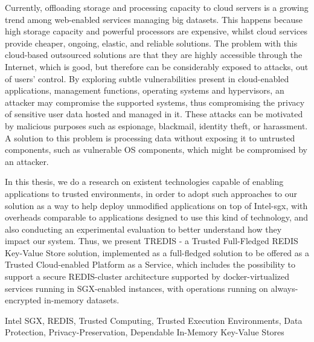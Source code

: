 
Currently, offloading storage and processing capacity to cloud servers is a growing
trend among web-enabled services managing big datasets. This happens because high
storage capacity and powerful processors are expensive, whilst cloud services provide
cheaper, ongoing, elastic, and reliable solutions. The problem with this cloud-based outsourced solutions are that they are highly accessible through the Internet, which is good,
but therefore can be considerably exposed to attacks, out of users’ control. By exploring
subtle vulnerabilities present in cloud-enabled applications, management functions, operating systems and hypervisors, an attacker may compromise the supported systems,
thus compromising the privacy of sensitive user data hosted and managed in it. These
attacks can be motivated by malicious purposes such as espionage, blackmail, identity
theft, or harassment. A solution to this problem is processing data without exposing it to
untrusted components, such as vulnerable OS components, which might be compromised
by an attacker.

In this thesis, we do a research on existent technologies capable of enabling applications to trusted environments, in order to adopt such approaches to our solution as a way to help deploy unmodified applications on top of Intel-\gls{sgx}, with overheads comparable to applications designed to use this kind of technology, and also conducting an experimental evaluation to better understand how they impact our system. 
Thus, we present TREDIS - a Trusted Full-Fledged REDIS Key-Value Store solution, implemented as a full-fledged solution to be offered as a Trusted Cloud-enabled Platform as a Service, which includes the possibility to support a secure REDIS-cluster architecture supported by docker-virtualized services running in SGX-enabled instances, with operations running on always-encrypted in-memory datasets.

\begin{keywords}
Intel SGX, REDIS, Trusted Computing, Trusted Execution Environments, Data Protection, Privacy-Preservation, Dependable In-Memory Key-Value Stores
\end{keywords} 


